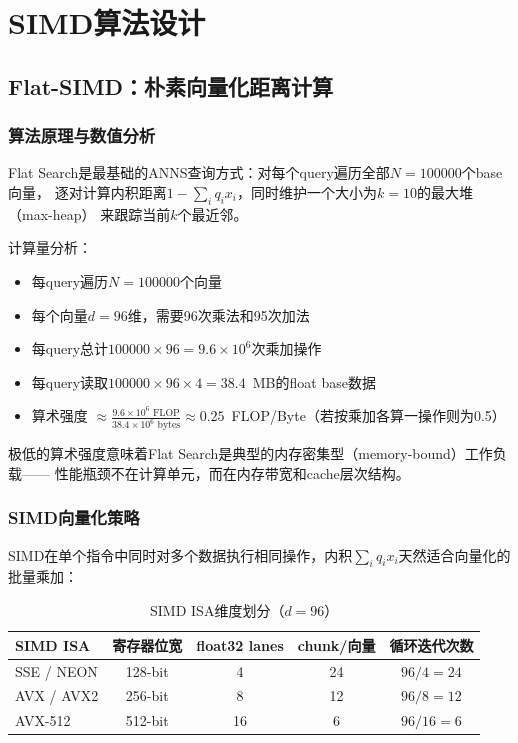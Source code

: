 \documentclass[11pt,a4paper]{article}
\begin{document}
\section{SIMD算法设计}

\subsection{Flat-SIMD：朴素向量化距离计算}

\subsubsection{算法原理与数值分析}

Flat Search是最基础的ANNS查询方式：对每个query遍历全部$N=100000$个base向量，
逐对计算内积距离$1-\sum_i q_i x_i$，同时维护一个大小为$k=10$的最大堆（max-heap）
来跟踪当前$k$个最近邻。

计算量分析：
\begin{itemize}[nosep]
    \item 每query遍历$N=100000$个向量
    \item 每个向量$d=96$维，需要96次乘法和95次加法
    \item 每query总计$100000\times 96 = 9.6\times 10^6$次乘加操作
    \item 每query读取$100000\times 96\times 4 = 38.4$~MB的float base数据
    \item 算术强度 $\approx \frac{9.6\times 10^6 \text{ FLOP}}{38.4\times 10^6 \text{ bytes}} \approx 0.25$~FLOP/Byte（若按乘加各算一操作则为0.5）
\end{itemize}
极低的算术强度意味着Flat Search是典型的内存密集型（memory-bound）工作负载——
性能瓶颈不在计算单元，而在内存带宽和cache层次结构。

\subsubsection{SIMD向量化策略}

SIMD在单个指令中同时对多个数据执行相同操作，内积$\sum_i q_i x_i$天然适合向量化的批量乘加：

\begin{table}[H]
\centering
\caption{SIMD ISA维度划分（$d=96$）}
\label{tab:simd_chunk}
\begin{tabular}{lcccc}
\toprule
\textbf{SIMD ISA} & \textbf{寄存器位宽} & \textbf{float32 lanes} & \textbf{chunk/向量} & \textbf{循环迭代次数} \\
\midrule
SSE / NEON & 128-bit & 4  & 24 & $96/4 = 24$ \\
AVX / AVX2 & 256-bit & 8  & 12 & $96/8 = 12$ \\
AVX-512   & 512-bit & 16 & 6  & $96/16 = 6$ \\
\bottomrule
\end{tabular}
\end{table}
\end{document}
